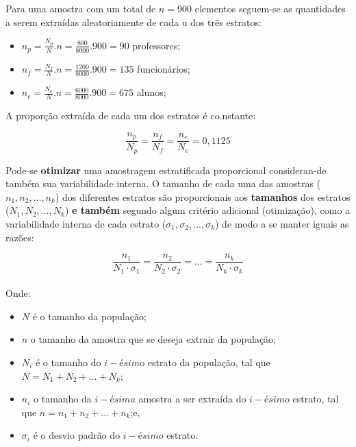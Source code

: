 \documentclass[
]{book}
\providecommand{\tightlist}{%
  \setlength{\itemsep}{0pt}\setlength{\parskip}{0pt}}
\begin{document}
\hfill\break

Para uma amostra com um total de \(n=900\) elementos seguem-se as quantidades a serem extraídas aleatoriamente de cada u dos trẽs estratos:

\hfill\break

\begin{itemize}
\tightlist
\item
  \(n_{p}=\frac{N_{p}}{N}.n=\frac{800}{8000}.900=90\) professores;
\item
  \(n_{f}=\frac{N_{f}}{N}.n=\frac{1200}{8000}.900=135\) funcionários;
\item
  \(n_{e}=\frac{N_{e}}{N}.n=\frac{6000}{8000}.900=675\) alunos;
\end{itemize}

\hfill\break

A proporção extraída de cada um dos estratos é co.nstante:

\hfill\break

\[
\frac{n_{p}}{N_{p}} = \frac{n_{f}}{N_{f}} =\frac{n_{e}}{N_{e}}=0,1125
\]

\hfill\break

Pode-se \textbf{otimizar} uma amostragem estratificada proporcional consideran-de também sua variabilidade interna. O tamanho de cada uma das amostras (\(n_{1},n_{2},\dots,n_{k}\)) dos diferentes estratos são proporcionais aos \textbf{tamanhos} dos estratos (\(N_{1},N_{2},\dots, N_{k}\)) \textbf{e também} segundo algum critério adicional (otimização), como a variabilidade interna de cada estrato (\(\sigma_{1},\sigma_{2},\dots,\sigma_{k}\)) de modo a se manter iguais as razões:

\hfill\break

\[
\frac{n_{1}}{N_{1} \cdot \sigma_{1}} = \frac{n_{2}}{N_{2} \cdot \sigma_{2}} = \dots = \frac{n_{k}}{N_{k} \cdot \sigma_{k}}
\]\\

Onde:\\

\begin{itemize}
\tightlist
\item
  \(N\) é o tamanho da população;\\
\item
  \(n\) o tamanho da amostra que se deseja extrair da população;\\
\item
  \(N_{i}\) é o tamanho do \(i-ésim\)o estrato da população, tal que \(N=N_{1}+N_{2}+\dots+N_{k}\);\\
\item
  \(n_{i}\) o tamanho da \(i-ésima\) amostra a ser extraída do \(i-ésimo\) estrato, tal que \(n = n_{1} + n_{2} + \dots + n_{k}\);e,
\item
  \(\sigma_{i}\) é o desvio padrão do \(i-ésimo\) estrato.\newline
\end{itemize}
\end{document}
